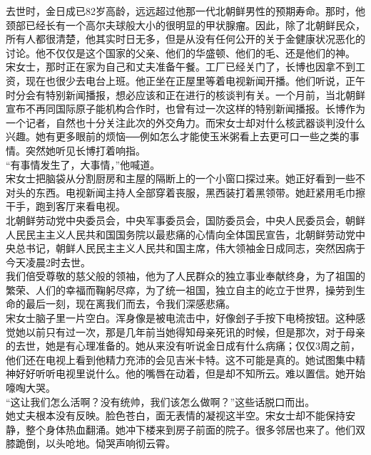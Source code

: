 去世时，金日成已82岁高龄，远远超过他那一代北朝鲜男性的预期寿命。那时，他颈部已经长有一个高尔夫球般大小的很明显的甲状腺瘤。因此，除了北朝鲜民众，所有人都很清楚，他其实时日无多，但是从没有任何公开的关于金健康状况恶化的讨论。他不仅仅是这个国家的父亲、他们的华盛顿、他们的毛、还是他们的神。\\

宋女士，那时正在家为自己和丈夫准备午餐。工厂已经关门了，长博也因拿不到工资，现在也很少去电台上班。他正坐在正屋里等着电视新闻开播。他们听说，正午时分会有特别新闻播报，想必应该和正在进行的核谈判有关。一个月前，当北朝鲜宣布不再同国际原子能机构合作时，也曾有过一次这样的特别新闻播报。长博作为一个记者，自然也十分关注此次的外交角力。而宋女士却对什么核武器谈判没什么兴趣。她有更多眼前的烦恼──例如怎么才能使玉米粥看上去更可口一些之类的事情。突然她听见长博打着响指。\\

“有事情发生了，大事情，”他喊道。\\

宋女士把脑袋从分割厨房和主屋的隔断上的一个小窗口探过来。她正好看到一些不对头的东西。电视新闻主持人全部穿着丧服，黑西装打着黑领带。她赶紧用毛巾擦干手，跑到客厅来看电视。\\

北朝鲜劳动党中央委员会，中央军事委员会，国防委员会，中央人民委员会，朝鲜人民民主主义人民共和国国务院以最悲痛的心情向全体国民宣告，北朝鲜劳动党中央总书记，朝鲜人民民主主义人民共和国主席，伟大领袖金日成同志，突然因病于今天凌晨2时去世。\\

我们倍受尊敬的慈父般的领袖，他为了人民群众的独立事业奉献终身，为了祖国的繁荣、人们的幸福而鞠躬尽瘁，为了统一祖国，独立自主的屹立于世界，操劳到生命的最后一刻，现在离我们而去，令我们深感悲痛。\\

宋女士脑子里一片空白。浑身像是被电流击中，好像刽子手按下电椅按钮。这种感觉她以前只有过一次，那是几年前当她得知母亲死讯的时候，但是那次，对于母亲的去世，她是有心理准备的。她从来没有听说金日成有什么病痛；仅仅3周之前，他们还在电视上看到他精力充沛的会见吉米卡特。这不可能是真的。她试图集中精神好好听听电视里说什么。他的嘴唇在动着，但是却不知所云。难以置信。她开始嚎啕大哭。\\

“这让我们怎么活啊？没有统帅，我们该怎么做啊？”这些话脱口而出。\\

她丈夫根本没有反映。脸色苍白，面无表情的凝视这半空。宋女士却不能保持安静，整个身体热血翻涌。她冲下楼来到房子前面的院子。很多邻居也来了。他们双膝跪倒，以头呛地。恸哭声响彻云霄。\\


